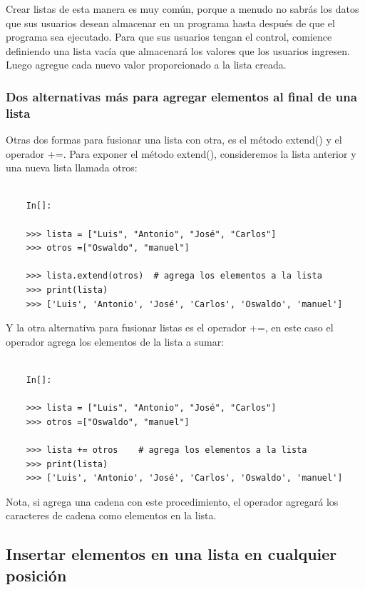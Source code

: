 Crear listas de esta manera es muy común, porque a menudo no sabrás
los datos que sus usuarios desean almacenar en un programa hasta después de que el programa sea ejecutado. 
Para que sus usuarios tengan el control, comience definiendo una lista vacía que
almacenará  los valores que los usuarios ingresen. Luego agregue cada nuevo valor proporcionado a la lista
creada.


\subsubsection{Dos alternativas más para agregar elementos al final de una lista}  %

Otras dos formas para fusionar una lista con otra, es el método {\ttfamily extend()}  y el operador {\ttfamily +=}. 
Para exponer el método  {\ttfamily extend()}, consideremos la lista anterior y una nueva lista llamada otros:
\begin{lstlisting}
	
	In[]:
	
	>>> lista = ["Luis", "Antonio", "José", "Carlos"]
	>>> otros =["Oswaldo", "manuel"]
	
	>>> lista.extend(otros)  # agrega los elementos a la lista
	>>> print(lista)
	>>> ['Luis', 'Antonio', 'José', 'Carlos', 'Oswaldo', 'manuel']
\end{lstlisting} 



Y la otra  alternativa  para fusionar  listas es el operador {\ttfamily	+=}, en este caso el operador agrega los elementos de la lista a sumar:

\begin{lstlisting}
	
	In[]:
	
	>>> lista = ["Luis", "Antonio", "José", "Carlos"]
	>>> otros =["Oswaldo", "manuel"]
	
	>>> lista += otros    # agrega los elementos a la lista
	>>> print(lista)
	>>> ['Luis', 'Antonio', 'José', 'Carlos', 'Oswaldo', 'manuel']
\end{lstlisting} 



Nota, si agrega una cadena con este procedimiento, el operador agregará los caracteres de  cadena como elementos  
en la lista.


\subsection{Insertar elementos en una lista en cualquier posición}

